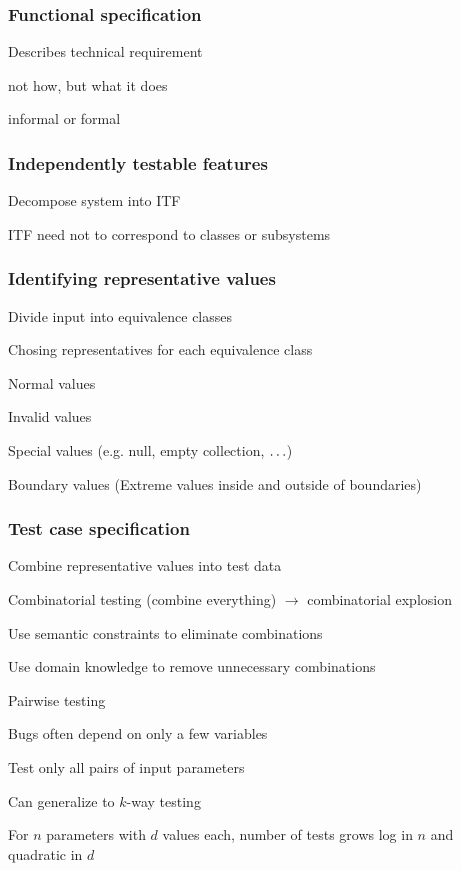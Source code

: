 \documentclass[10pt]{article}
\begin{document}
\subsubsection{Functional specification}
\enumstart
	\item Describes technical requirement
	\item not how, but what it does
	\item informal or formal
\enumend

\subsubsection{Independently testable features}
\enumstart
	\item Decompose system into ITF
	\item ITF need not to correspond to classes or subsystems
\enumend

\subsubsection{Identifying representative values}
\enumstart
	\item Divide input into equivalence classes
	\item Chosing representatives for each equivalence class
	\enumstart
		\item Normal values
		\item Invalid values
		\item Special values (e.g. null, empty collection, $\mathellipsis$)
		\item Boundary values (Extreme values inside and outside of boundaries)
	\enumend
\enumend

\subsubsection{Test case specification}
\enumstart
	\item Combine representative values into test data
	\item Combinatorial testing (combine everything) $\rightarrow$ combinatorial explosion
	\enumstart
		\item Use semantic constraints to eliminate combinations
		\item Use domain knowledge to remove unnecessary combinations
	\enumend
	\item Pairwise testing
	\enumstart
		\item Bugs often depend on only a few variables
		\item Test only all pairs of input parameters
		\item Can generalize to $k$-way testing
		\item For $n$ parameters with $d$ values each, number of tests grows log in $n$ and quadratic in $d$
	\enumend
\enumend
\end{document}
